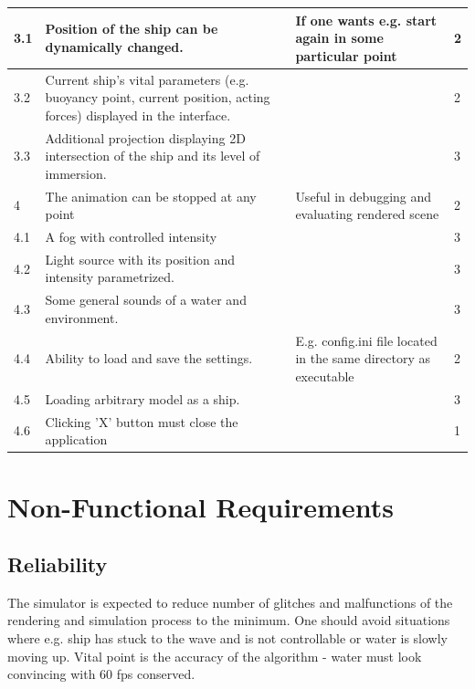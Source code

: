 \documentclass{report}
\begin{document}
\begin{center}
\begin{longtable}{| l | p{4cm} | p{3.5cm} | l |}
		3.1 & 
		Position of the ship can be dynamically changed.
& If one wants e.g. start again in some particular point
		 &
		2
		\\ \hline	
	
		3.2 & 
		Current ship’s vital parameters (e.g. buoyancy point, current position, acting forces) displayed in the interface. & 
		 &
		2 
		\\ \hline		
		

		3.3 & 
		Additional projection displaying 2D intersection of the ship and its level of immersion. & 
		 &
		3
		\\ \hline		


		4 & 
		The animation can be stopped at any point  & Useful in debugging
and evaluating rendered scene

		 &
		2
		\\ \hline
	
		4.1 & 
		A fog with controlled intensity& 
		 &
		3
		\\ \hline	

		4.2 & 
		Light source with its position and intensity parametrized. & 
		 &
		3
		\\ \hline

		4.3 & 
		Some general sounds of a water and environment. & 
		 &
		3
		\\ \hline
	
		4.4 & 
		Ability to load and save the settings. & E.g. config.ini file located in the same directory as executable
		 &
		2
		\\ \hline
		
		4.5 & 
		Loading arbitrary model as a ship. & 
		 &
		3
		\\ \hline
		
		4.6 & 
		Clicking ’X’ button must close the application
 & 
		 &
		1
		\\ \hline	
		
	\end{longtable}
\end{center}

\section{Non-Functional Requirements}
\subsection{Reliability}
The simulator is expected to reduce number of glitches and malfunctions of the rendering and simulation process to the minimum. One should avoid situations where e.g. ship has stuck to the wave and is not controllable or water is slowly moving up. Vital point is the accuracy of the algorithm - water must look convincing with 60 fps conserved.
\end{document}
